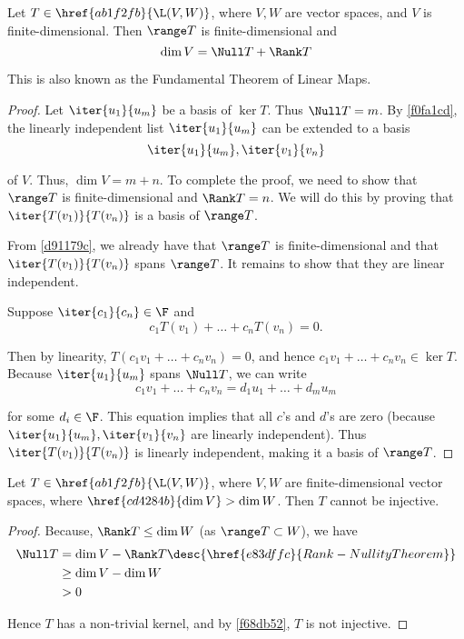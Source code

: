 \label{e83dffc}

Let $T\in\href{ab1f2fb}{\L(V,W)}$, where $V,W$ are vector spaces, and $V$ is
finite-dimensional. Then \href{a3ef003}{$\range T$} is finite-dimensional and
$$
  \dim V=\Null T+\Rank T
$$

This is also known as the Fundamental Theorem of Linear Maps.

\begin{proof}
  Let $\iter{u_1}{u_m}$ be a basis of $\ker T$. Thus $\Null T=m$. By
  \autoref{f0fa1cd}, the linearly independent list $\iter{u_1}{u_m}$ can be
  extended to a basis
  $$
    \iter{u_1}{u_m},\iter{v_1}{v_n}
  $$

  of $V$. Thus, $\dim V=m+n$. To complete the proof, we need to show that
  $\range T$ is finite-dimensional and $\Rank T=n$. We will do this by proving
  that $\iter{T(v_1)}{T(v_n)}$ is a basis of $\range T$.

  From \autoref{d91179c}, we already have that $\range T$ is finite-dimensional
  and that $\iter{T(v_1)}{T(v_n)}$ spans $\range T$. It remains to show that
  they are linear independent.

  Suppose $\iter{c_1}{c_n}\in\F$ and
  $$
    c_1T(v_1)+\ldots+c_nT(v_n)=0.
  $$

  Then by linearity, $T(c_1v_1+\ldots+c_nv_n)=0$, and hence
  $c_1v_1+\ldots+c_nv_n\in\ker T$. Because $\iter{u_1}{u_m}$ spans $\Null T$,
  we can write
  $$
    c_1v_1+\ldots+c_nv_n=d_1u_1+\ldots+d_mu_m
  $$

  for some $d_i\in\F$. This equation implies that all $c$'s and $d$'s are zero
  (because $\iter{u_1}{u_m},\iter{v_1}{v_n}$ are linearly independent). Thus
  $\iter{T(v_1)}{T(v_n)}$ is linearly independent, making it a basis of $\range
  T$.
\end{proof}

\label{a9db518}

Let $T\in\href{ab1f2fb}{\L(V,W)}$, where $V,W$ are finite-dimensional vector
spaces, where $\href{cd4284b}{\dim V}>\dim W$. Then $T$ cannot be injective.

\begin{proof}
  Because, $\Rank T\leq\dim W$ (as $\range T\subset W$), we have
  \begin{align*}
    \Null T &=\dim V-\Rank T\desc{\href{e83dffc}{Rank-Nullity Theorem}} \\
            &\geq\dim V-\dim W                                          \\
            &>0
  \end{align*}

  Hence $T$ has a non-trivial kernel, and by \autoref{f68db52}, $T$ is not
  injective.
\end{proof}


